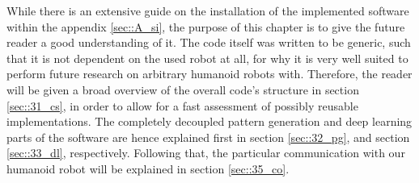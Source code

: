 \label{sec::3_me}
While there is an extensive guide on the installation of the implemented software within the appendix \ref{sec::A_si}, the purpose of this chapter is to give the future reader a good understanding of it. The code itself was written to be generic, such that it is not dependent on the used robot at all, for why it is very well suited to perform future research on arbitrary humanoid robots with. Therefore, the reader will be given a broad overview of the overall code's structure in section \ref{sec::31_cs}, in order to allow for a fast assessment of possibly reusable implementations. The completely decoupled pattern generation and deep learning parts of the software are hence explained first in section \ref{sec::32_pg}, and section \ref{sec::33_dl}, respectively. Following that, the particular communication with our humanoid robot will be explained in section \ref{sec::35_co}.







